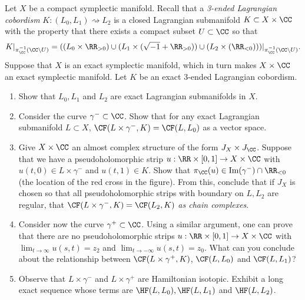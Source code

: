 
 
 
Let $X$ be a compact symplectic manifold. Recall that a \emph{3-ended Lagrangian cobordism} $K: (L_0, L_1)\rightsquigarrow L_2$ is a closed Lagrangian submanifold $K\subset X\times \CC$ with the property that there exists a compact subset $U\subset \CC$ so that \[K|_{\pi_\CC^{-1}(\CC\setminus U)}=((L_0\times \RR_{>0})\cup( L_1\times (\sqrt{-1}+\RR_{>0}) )\cup( L_2\times (\RR_{<0})))|_{\pi_\CC^{-1}(\CC\setminus U)}.\]
Suppose that $X$ is an exact symplectic manifold, which in turn makes $X\times \CC$ an exact symplectic manifold. Let $K$ be an exact 3-ended Lagrangian cobordism. 
    
\begin{enumerate}
    \item Show that $L_0, L_1$ and $L_2$ are exact Lagrangian submanifolds in $X$.
    \item Consider the curve $\gamma^-\subset \CC$. Show that for any exact Lagrangian submanifold $L\subset X$, $\CF(L\times \gamma^-, K)=\CF(L, L_0)$ as a vector space. 
    \item Give $X\times \CC$ an almost complex structure of the form $J_X\times J_\CC$. Suppose that we have a pseudoholomorphic strip $u: \RR\times [0, 1]\to X\times \CC$ with $u(t, 0)\in L\times \gamma^-$ and $u(t, 1)\in K$. Show that $\pi_\CC(u)\in \text{Im}(\gamma^-)\cap \RR_{<0}$ (the location of the red cross in the figure). From this, conclude that if $J_X$ is chosen so that all pseudoholomorphic strips with boundary on $L, L_2$ are regular, that $\CF(L\times \gamma^-, K) = \CF(L_2, K)$ \emph{as chain complexes}.
        
    \item Consider now the curve $\gamma^+\subset \CC$. Using a similar argument, one can prove that there are no pseudoholomorphic strips $u:\RR\times [0, 1]\to X\times \CC$ with $\lim_{t\to\infty} u(s, t)=z_2$ and $\lim_{t\to-\infty} u(s, t)=z_0$. What can you conclude about the relationship between $\CF(L\times \gamma^+, K)$, $\CF(L, L_0)$ and $\CF(L, L_1)$?
        
    \item Observe that $L\times \gamma^-$ and $L\times \gamma^+$ are Hamiltonian isotopic. Exhibit a long exact sequence whose terms are $\HF(L, L_0), \HF(L, L_1)$ and $\HF(L, L_2)$.
\end{enumerate}

 